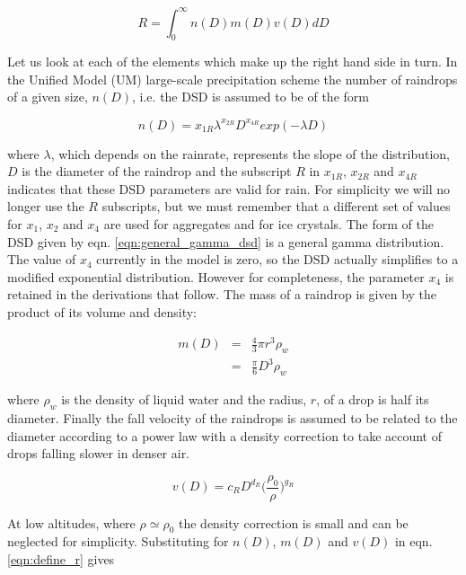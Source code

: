 \documentclass{UMDP_article}
\begin{document}
\begin{equation}
R=\int_{0}^{\infty} n(D) m(D) v(D) dD 
\label{eqn:define_r}
\end{equation}

Let us look at each of the elements which make up the right hand side in turn. 
In the Unified Model (UM) large-scale precipitation scheme the number of raindrops 
of a given size, $n(D)$, i.e. the DSD is assumed to be of the form

\begin{equation}
n(D)=x_{1R} \lambda^{x_{2R}} D^{x_{4R}} exp(- \lambda D)
\label{eqn:general_gamma_dsd}
\end{equation}

where $\lambda$, which depends on the rainrate, represents the slope of the distribution, 
$D$ is the diameter of the raindrop and the subscript $R$ in $x_{1R}$, $x_{2R}$ and $x_{4R}$ 
indicates that these DSD parameters are valid for rain. For simplicity we will no longer 
use the $R$ subscripts, but we must remember that a different set of values for $x_{1}$, 
$x_{2}$ and $x_{4}$ are used for aggregates and for ice crystals. The form of the DSD 
given by eqn. \ref{eqn:general_gamma_dsd} is a general gamma distribution. 
The value of $x_{4}$ currently in the model is zero, so the DSD actually simplifies 
to a modified exponential distribution. However for completeness, the parameter 
$x_{4}$ is retained in the derivations that follow. The mass of a raindrop is given by 
the product of its volume and density:

\begin{eqnarray}
m(D)&=&\frac{4}{3}\pi r^{3} \rho_{w}\nonumber \\
&=&\frac{\pi}{6} D^{3} \rho_{w}
\end{eqnarray}

where $\rho_{w}$ is the density of liquid water and the radius, $r$, of a drop is half its diameter. 
Finally the fall velocity of the raindrops is assumed to be related to the diameter according 
to a power law with a density correction to take account of drops falling slower in denser air.

\begin{equation}
v(D)=c_{R} D^{d_{R}}\Big(\frac{\rho_{0}}{\rho}\Big)^{g_{R}}
\end{equation}

At low altitudes, where $\rho \simeq \rho_{0}$ the density correction is small and can be 
neglected for simplicity. Substituting for $n(D)$, $m(D)$ and $v(D)$ in eqn. 
\ref{eqn:define_r} gives
\end{document}

